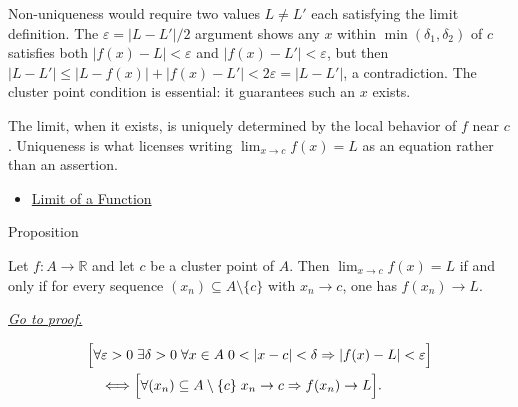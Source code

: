 \begin{remark*}
Non-uniqueness would require two values $L \neq L'$ each satisfying
the limit definition. The $\varepsilon = |L-L'|/2$ argument shows
any $x$ within $\min(\delta_1,\delta_2)$ of $c$ satisfies both
$|f(x)-L| < \varepsilon$ and $|f(x)-L'| < \varepsilon$, but then
$|L-L'| \leq |L-f(x)|+|f(x)-L'| < 2\varepsilon = |L-L'|$, a
contradiction. The cluster point condition is essential: it guarantees
such an $x$ exists.
\end{remark*}

\begin{remark*}[Interpretation]
The limit, when it exists, is uniquely determined by the local
behavior of $f$ near $c$. Uniqueness is what licenses writing
$\lim_{x\to c} f(x) = L$ as an equation rather than an assertion.
\end{remark*}

\begin{dependencies}
\begin{itemize}
  \item \hyperref[def:limit-function]{Limit of a Function}
\end{itemize}
\end{dependencies}


\begin{propositionbox}{Proposition}
\begin{proposition}
\label{prop:sequential-criterion-limits}
Let $f : A \to \mathbb{R}$ and let $c$ be a cluster point of $A$.
Then $\lim_{x\to c}f(x)=L$ if and only if for every sequence
$(x_n)\subseteq A\setminus\{c\}$ with $x_n\to c$, one has
$f(x_n)\to L$.

\smallskip\noindent
\hyperref[prf:sequential-criterion-limits]{\textit{Go to proof.}}
\end{proposition}
\end{propositionbox}

\begin{remark*}
\[
\begin{aligned}
&\Bigl[\forall\varepsilon>0\;\exists\delta>0\;\forall x\in A\;
  0<|x-c|<\delta\Rightarrow |f(x)-L|<\varepsilon\Bigr] \\
&\quad\Longleftrightarrow
\Bigl[\forall (x_n)\subseteq A\setminus\{c\}\;
  x_n\to c\Rightarrow f(x_n)\to L\Bigr].
\end{aligned}
\]
\end{remark*}

